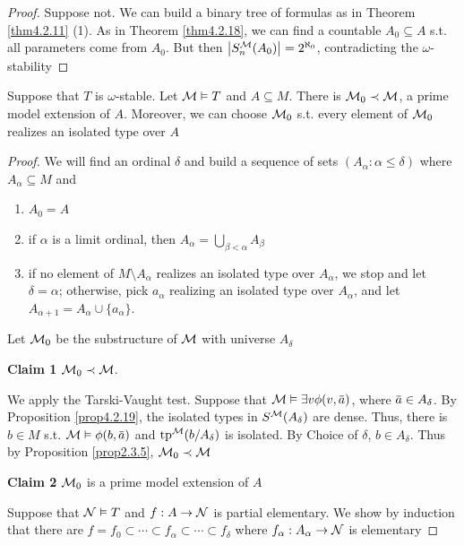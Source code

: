 \documentclass[11pt]{article}
\begin{document}
\begin{proof}
Suppose not. We can build a binary tree of formulas as in Theorem \ref{thm4.2.11} (1). As in
Theorem \ref{thm4.2.18}, we can find a countable \(A_0\subseteq A\) s.t. all parameters come from \(A_0\).
But then \(\abs{S_n^{\calm}(A_0)}=2^{\aleph_0}\), contradicting the \(\omega\)-stability
\end{proof}

\begin{theorem}[]
\label{thm4.2.20}
Suppose that \(T\) is \(\omega\)-stable. Let \(\mathcal{M}\vDash T\) and \(A\subseteq M\). There is \(\mathcal{M}_0\prec\mathcal{M}\), a prime model
extension of \(A\). Moreover, we can choose \(\mathcal{M}_0\) s.t. every element of \(\mathcal{M}_0\) realizes an
isolated type over \(A\)
\end{theorem}

\begin{proof}
We will find an ordinal \(\delta\) and build a sequence of sets \((A_\alpha:\alpha\le\delta)\) where \(A_\alpha\subseteq M\) and
\begin{enumerate}
\item \(A_0=A\)
\item if \(\alpha\) is a limit ordinal, then \(A_\alpha=\bigcup_{\beta<\alpha}A_\beta\)
\item if no element of \(M\setminus A_\alpha\) realizes an isolated type over \(A_\alpha\), we stop and let \(\delta=\alpha\);
otherwise, pick \(a_\alpha\) realizing an isolated type over \(A_\alpha\), and
let \(A_{\alpha+1}=A_\alpha\cup\{a_\alpha\}\).
\end{enumerate}

Let \(\mathcal{M}_0\) be the substructure of \(\mathcal{M}\) with universe \(A_\delta\)


\textbf{Claim 1} \(\mathcal{M}_0\prec\mathcal{M}\).

We apply the Tarski-Vaught test. Suppose that \(\calm\vDash\exists v\phi(v,\bara)\), where \(\bara\in A_\delta\). By
Proposition \ref{prop4.2.19}, the isolated types in \(S^{\mathcal{M}}(A_\delta)\) are dense. Thus, there
is \(b\in M\) s.t. \(\calm\vDash\phi(b,\bara)\) and \(\operatorname{tp}^{\mathcal{M}}(b/A_\delta)\) \label{Problem4} is isolated.
By Choice of
\(\delta\), \(b\in A_\delta\). Thus by Proposition \ref{prop2.3.5}, \(\mathcal{M}_0\prec\mathcal{M}\)

\textbf{Claim 2} \(\mathcal{M}_0\) is a prime model extension of \(A\)

Suppose that \(\mathcal{N}\vDash T\) and \(f:A\to\mathcal{N}\) is partial elementary. We show by induction that there
are \(f=f_0\subset\cdots\subset f_\alpha\subset\cdots\subset f_\delta\) where \(f_\alpha:A_\alpha\to\mathcal{N}\) is elementary


\end{proof}
\end{document}
